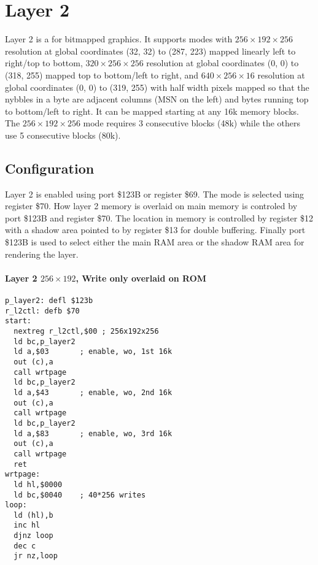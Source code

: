 \section{Layer 2}
Layer 2 is a for bitmapped graphics. It supports modes with
$256\times192\times256$ resolution at global coordinates (32, 32) to
(287, 223) mapped linearly left to right/top to bottom,
$320\times256\times256$ resolution at global coordinates (0, 0) to
(318, 255) mapped top to bottom/left to right, and
$640\times256\times16$ resolution at global coordinates (0, 0) to
(319, 255) with half width pixels mapped so that the nybbles in a byte
are adjacent columns (MSN on the left) and bytes running top to
bottom/left to right. It can be mapped starting at any 16k memory
blocks. The $256\times192\times256$ mode requires 3 consecutive blocks
(48k) while the others use 5 consecutive blocks (80k).

\subsection{Configuration}
Layer 2 is enabled using port \$123B or register \$69. The mode is
selected using register \$70. How layer 2 memory is overlaid on main
memory is controled by port \$123B and register \$70. The location in
memory is controlled by register \$12 with a shadow area pointed to by
register \$13 for double buffering. Finally port \$123B is used to
select either the main RAM area or the shadow RAM area for rendering
the layer.







\paragraph{Layer 2 $256\times192$, Write only overlaid on ROM}
\begin{verbatim}
p_layer2: defl $123b
r_l2ctl: defb $70
start:
  nextreg r_l2ctl,$00 ; 256x192x256
  ld bc,p_layer2
  ld a,$03       ; enable, wo, 1st 16k
  out (c),a
  call wrtpage
  ld bc,p_layer2
  ld a,$43       ; enable, wo, 2nd 16k
  out (c),a
  call wrtpage
  ld bc,p_layer2
  ld a,$83       ; enable, wo, 3rd 16k
  out (c),a
  call wrtpage
  ret
wrtpage:  
  ld hl,$0000
  ld bc,$0040    ; 40*256 writes
loop:
  ld (hl),b
  inc hl
  djnz loop
  dec c
  jr nz,loop
\end{verbatim}

